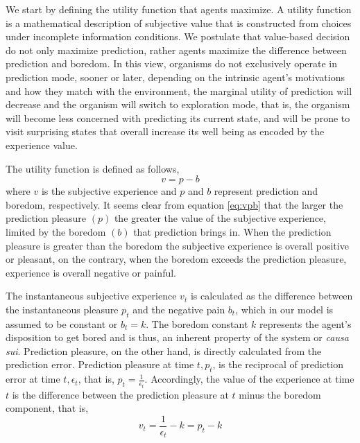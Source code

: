 \documentclass[11pt, onecolumn]{article}
\begin{document}
We start by defining the utility function that agents maximize. 
A utility function is a mathematical description of subjective value that is constructed from choices under incomplete information conditions. We postulate that value-based decision do not only maximize prediction, rather agents maximize the difference between prediction and boredom. In this view, organisms do not exclusively operate in prediction mode, sooner or later, depending on the intrinsic agent's motivations and how they match with the environment, the marginal utility of prediction will decrease and the organism will switch to exploration mode, that is, the organism will become less concerned with predicting its current state, and  will be prone to visit surprising states that overall increase its well being as encoded by the experience value. 

The utility function is defined as follows,
\begin{equation}
    v =  p - b
\label{eq:vpb}
\end{equation}
where $v$ is the subjective experience and $p$ and $b$ represent prediction and boredom, respectively. 
It seems clear from equation \ref{eq:vpb} that the larger the prediction pleasure $(p)$ the greater the value of the subjective experience, limited by the boredom $(b)$ that prediction brings in.  
When the prediction pleasure is greater than the boredom the subjective experience is overall positive or pleasant, on the contrary, when the boredom exceeds the prediction pleasure, experience is overall negative or painful. 

The instantaneous subjective experience $v_t$ is calculated as the difference between the instantaneous pleasure $p_t$ and the negative pain $b_t$, which in our model is assumed to be constant or $b_t=k$. The boredom constant $k$ represents the agent's disposition to get bored and is thus, an inherent property of the system or \emph{causa sui}. Prediction pleasure, on the other hand, is directly calculated from the prediction error.
Prediction pleasure at time $t, p_t$, is the reciprocal of prediction error at time $t, \epsilon_t$, that is, $p_t = \frac{1}{\epsilon_t}$.
Accordingly, the value of the experience at time $t$ is the difference between the prediction pleasure at $t$ minus the boredom component, that is,
\begin{equation}
    v_t = \frac{1}{\epsilon_t} - k = p_t - k
\label{eq:vpbt}
\end{equation}
\end{document}
